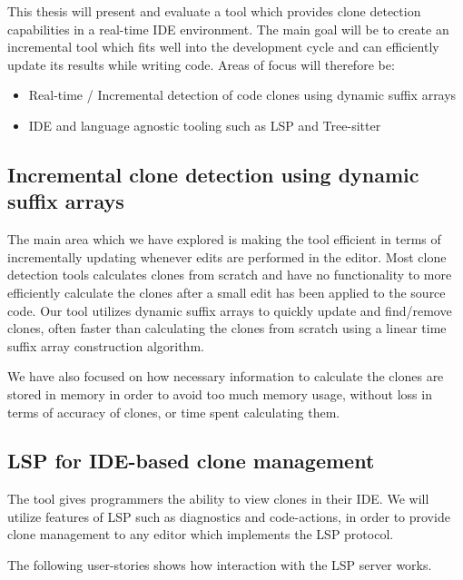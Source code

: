 This thesis will present and evaluate a tool which provides clone detection capabilities
in a real-time IDE environment. The main goal will be to create an incremental tool which
fits well into the development cycle and can efficiently update its results while writing
code. Areas of focus will therefore be:

\begin{itemize}
	\item Real-time / Incremental detection of code clones using dynamic suffix arrays
	\item IDE and language agnostic tooling such as LSP and Tree-sitter
\end{itemize}

\subsection{Incremental clone detection using dynamic suffix arrays}

The main area which we have explored is making the tool efficient in terms of
incrementally updating whenever edits are performed in the editor. Most clone detection
tools calculates clones from scratch and have no functionality to more efficiently
calculate the clones after a small edit has been applied to the source code. Our tool
utilizes dynamic suffix arrays to quickly update and find/remove clones, often faster than
calculating the clones from scratch using a linear time suffix array construction
algorithm.

We have also focused on how necessary information to calculate the clones are stored in
memory in order to avoid too much memory usage, without loss in terms of accuracy of
clones, or time spent calculating them.

\subsection{LSP for IDE-based clone management}

The tool gives programmers the ability to view clones in their IDE. We will utilize
features of LSP such as diagnostics and code-actions, in order to provide clone management
to any editor which implements the LSP protocol.

The following user-stories shows how interaction with the LSP server works.

